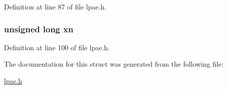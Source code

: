 \-Definition at line 87 of file lpae.\-h.

\hypertarget{structlpae__p2m__t_a14c376b2856f5d0a79874df679a35d94}{
\subsubsection[{xn}]{\setlength{\rightskip}{0pt plus 5cm}unsigned long {\bf xn}}}\label{structlpae__p2m__t_a14c376b2856f5d0a79874df679a35d94}


\-Definition at line 100 of file lpae.\-h.



\-The documentation for this struct was generated from the following file\-:\begin{DoxyCompactItemize}
\item 
\hyperlink{lpae_8h}{lpae.\-h}\end{DoxyCompactItemize}
